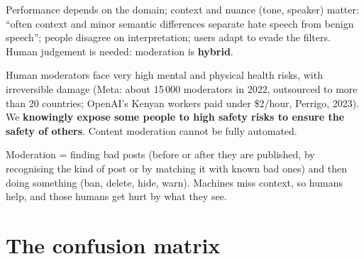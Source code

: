 \documentclass[11pt,a4paper,openany]{book}
\begin{document}
\begin{warnbox}[title={Limits of automated moderation (Duarte et al., 2017)}]
Performance depends on the domain; context and nuance (tone, speaker) matter: ``often context and
minor semantic differences separate hate speech from benign speech''; people disagree on
interpretation; users adapt to evade the filters. Human judgement is needed: moderation is
\textbf{hybrid}.
\end{warnbox}

\begin{keybox}[title={The human moderators' dilemma}]
Human moderators face very high mental and physical health risks, with irreversible damage (Meta:
about 15\,000 moderators in 2022, outsourced to more than 20 countries; OpenAI's Kenyan workers
paid under \$2/hour, Perrigo, 2023). We \textbf{knowingly expose some people to high safety risks
to ensure the safety of others}. Content moderation cannot be fully automated.
\end{keybox}

\begin{goatbox}
Moderation = finding bad posts (before or after they are published, by recognising the kind of
post or by matching it with known bad ones) and then doing something (ban, delete, hide, warn).
Machines miss context, so humans help, and those humans get hurt by what they see.
\end{goatbox}


\section{The confusion matrix}
\end{document}
